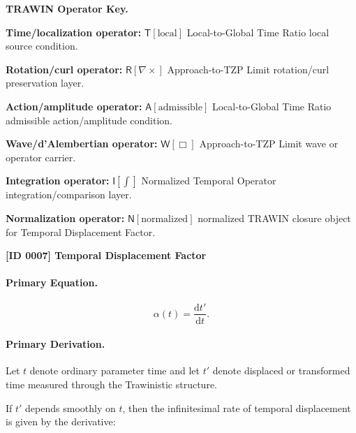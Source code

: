\par\vspace{0.45\baselineskip}
\noindent\begin{minipage}[t]{\linewidth}
\begingroup
\small
\raggedright
\textbf{TRAWIN Operator Key.}\par
\noindent\textbf{Time/localization operator:} $\mathsf{T}\!\left[\mathrm{local}\right]$ Local-to-Global Time Ratio local source condition.\par
\noindent\textbf{Rotation/curl operator:} $\mathsf{R}\!\left[\nabla\times\right]$ Approach-to-TZP Limit rotation/curl preservation layer.\par
\noindent\textbf{Action/amplitude operator:} $\mathsf{A}\!\left[\mathrm{admissible}\right]$ Local-to-Global Time Ratio admissible action/amplitude condition.\par
\noindent\textbf{Wave/d'Alembertian operator:} $\mathsf{W}\!\left[\Box\right]$ Approach-to-TZP Limit wave or operator carrier.\par
\noindent\textbf{Integration operator:} $\mathsf{I}\!\left[\int\right]$ Normalized Temporal Operator integration/comparison layer.\par
\noindent\textbf{Normalization operator:} $\mathsf{N}\!\left[\mathrm{normalized}\right]$ normalized TRAWIN closure object for Temporal Displacement Factor.\par
\endgroup
\end{minipage}

\clearpage
\noindent\textbf{[ID 0007] Temporal Displacement Factor}\par
\vspace{0.35em}
\paragraph{Primary Equation.}
\begin{equation}
\alpha(t)=\frac{\mathrm{d}t'}{\mathrm{d}t}.
\end{equation}

\paragraph{Primary Derivation.}
Let $t$ denote ordinary parameter time and let $t'$ denote displaced or transformed time measured through the Trawinistic structure.

If $t'$ depends smoothly on $t$, then the infinitesimal rate of temporal displacement is given by the derivative:

